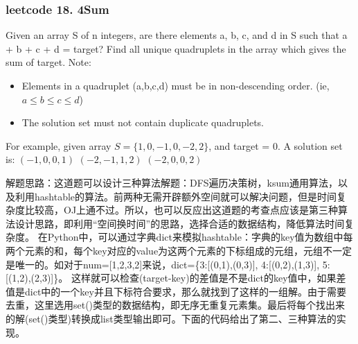 \documentclass[a4paper,10pt]{article}
\begin{document}
\subsubsection{leetcode 18. 4Sum}
Given an array S of n integers, are there elements a, b, c, and d in S such that a + b + c + d = target? Find all unique quadruplets in the array which gives the sum of target. Note:
\begin{itemize}
    \item Elements in a quadruplet (a,b,c,d) must be in non-descending order. (ie, $a \leq b \leq c \leq d$)
    \item The solution set must not contain duplicate quadruplets.
\end{itemize}

\noindent For example, given array $S = \{1,0,-1,0,-2,2\}$, and target = 0.
    A solution set is:
    $(-1,  0, 0, 1)$
    $(-2, -1, 1, 2)$
    $(-2,  0, 0, 2)$ \\

\begin{CJK*}{UTF8}{gbsn}
\noindent 解题思路：这道题可以设计三种算法解题：DFS遍历决策树，ksum通用算法，以及利用hashtable的算法。前两种无需开辟额外空间就可以解决问题，但是时间复杂度比较高，OJ上通不过。所以，也可以反应出这道题的考查点应该是第三种算法设计思路，即利用“空间换时间”的思路，选择合适的数据结构，降低算法时间复杂度。
\noindent 在Python中，可以通过字典dict来模拟hashtable：字典的key值为数组中每两个元素的和，每个key对应的value为这两个元素的下标组成的元组，元组不一定是唯一的。如对于num=[1,2,3,2]来说，dict=\{3:[(0,1),(0,3)], 4:[(0,2),(1,3)], 5:[(1,2),(2,3)]\}。 这样就可以检查(target-key)的差值是不是dict的key值中，如果差值是dict中的一个key并且下标符合要求，那么就找到了这样的一组解。由于需要去重，这里选用set()类型的数据结构，即无序无重复元素集。最后将每个找出来的解(set()类型)转换成list类型输出即可。下面的代码给出了第二、三种算法的实现。\\
\end{CJK*}
\end{document}
